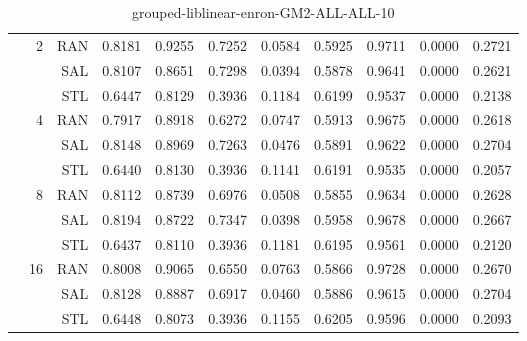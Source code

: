\begin{center}
\begin{table}[htbp]
\begin{tabular}{ | r | r | r | r | r | r | r | r | r | r | r |}
 & \multirow{3}{*}{2} & RAN & 0.8181 & 0.9255 & 0.7252 & 0.0584 & 0.5925 & 0.9711 & 0.0000 & 0.2721\\ \cline{3-11}
 &   & SAL & 0.8107 & 0.8651 & 0.7298 & 0.0394 & 0.5878 & 0.9641 & 0.0000 & 0.2621\\ \cline{3-11}
 &   & STL & 0.6447 & 0.8129 & 0.3936 & 0.1184 & 0.6199 & 0.9537 & 0.0000 & 0.2138\\ \cline{2-11}
 & \multirow{3}{*}{4} & RAN & 0.7917 & 0.8918 & 0.6272 & 0.0747 & 0.5913 & 0.9675 & 0.0000 & 0.2618\\ \cline{3-11}
 &   & SAL & 0.8148 & 0.8969 & 0.7263 & 0.0476 & 0.5891 & 0.9622 & 0.0000 & 0.2704\\ \cline{3-11}
 &   & STL & 0.6440 & 0.8130 & 0.3936 & 0.1141 & 0.6191 & 0.9535 & 0.0000 & 0.2057\\ \cline{2-11}
 & \multirow{3}{*}{8} & RAN & 0.8112 & 0.8739 & 0.6976 & 0.0508 & 0.5855 & 0.9634 & 0.0000 & 0.2628\\ \cline{3-11}
 &   & SAL & 0.8194 & 0.8722 & 0.7347 & 0.0398 & 0.5958 & 0.9678 & 0.0000 & 0.2667\\ \cline{3-11}
 &   & STL & 0.6437 & 0.8110 & 0.3936 & 0.1181 & 0.6195 & 0.9561 & 0.0000 & 0.2120\\ \cline{2-11}
 & \multirow{3}{*}{16} & RAN & 0.8008 & 0.9065 & 0.6550 & 0.0763 & 0.5866 & 0.9728 & 0.0000 & 0.2670\\ \cline{3-11}
 &   & SAL & 0.8128 & 0.8887 & 0.6917 & 0.0460 & 0.5886 & 0.9615 & 0.0000 & 0.2704\\ \cline{3-11}
 &   & STL & 0.6448 & 0.8073 & 0.3936 & 0.1155 & 0.6205 & 0.9596 & 0.0000 & 0.2093\\ \cline{2-11}
\hline
\end{tabular}
\caption{grouped-liblinear-enron-GM2-ALL-ALL-10}
\end{table}
\end{center}

